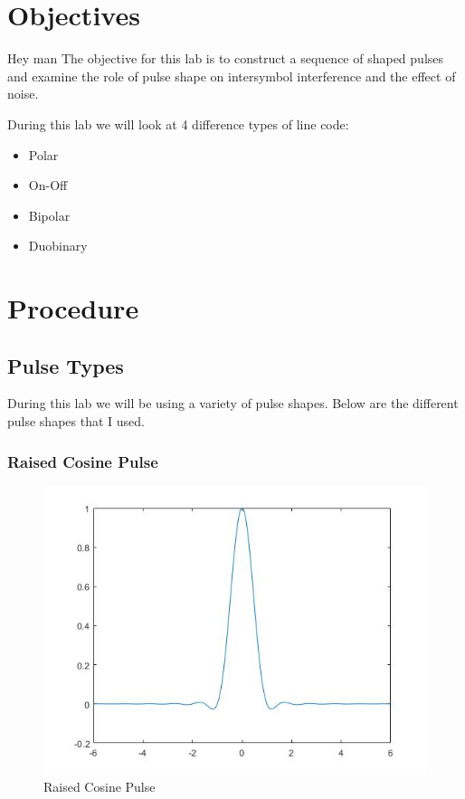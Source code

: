 \documentclass{article}
\begin{document}
\section{Objectives}
\indent
Hey man
The objective for this lab is to construct a sequence of shaped pulses and examine the role of pulse shape on intersymbol interference and the effect of noise.

\noindent
During this lab we will look at 4 difference types of line code:
  \begin{itemize}
    \item Polar
    \item On-Off
    \item Bipolar
    \item Duobinary
  \end{itemize}

\section{Procedure}

\subsection{Pulse Types}
During this lab we will be using a variety of pulse shapes. Below are the different pulse shapes that I used.

\subsubsection{Raised Cosine Pulse}
\begin{figure}[H]
  \begin{center}
    \includegraphics[width = 0.4\linewidth]{Raised_Cosine_Pulse.jpg}
    \caption{Raised Cosine Pulse}
    \label{fig:Raised_Cosine_Pulse}
  \end{center}
\end{figure}
\end{document}
